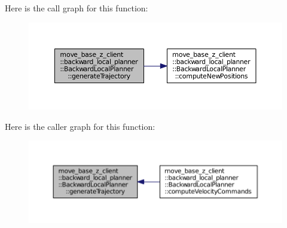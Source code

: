 Here is the call graph for this function\+:
\nopagebreak
\begin{figure}[H]
\begin{center}
\leavevmode
\includegraphics[width=350pt]{classmove__base__z__client_1_1backward__local__planner_1_1BackwardLocalPlanner_a5da53f29e43639a9af5ba3b640e6bf8c_cgraph}
\end{center}
\end{figure}




Here is the caller graph for this function\+:
\nopagebreak
\begin{figure}[H]
\begin{center}
\leavevmode
\includegraphics[width=350pt]{classmove__base__z__client_1_1backward__local__planner_1_1BackwardLocalPlanner_a5da53f29e43639a9af5ba3b640e6bf8c_icgraph}
\end{center}
\end{figure}



